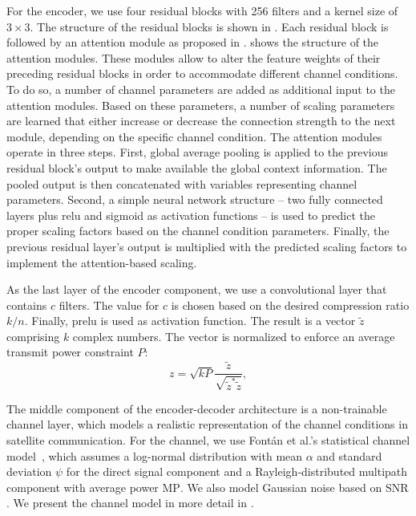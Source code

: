 \documentclass[conference]{IEEEtran}
\newcommand\MP{\ensuremath{\mathrm{MP}}\xspace}
\newcommand\SNR{\ensuremath{\mathrm{SNR}}\xspace}
\begin{document}
For the encoder, we use four residual blocks with 256 filters and a kernel size of $3 \times 3$.
The structure of the residual blocks is shown in .
Each residual block is followed by an attention module as proposed in \cite{wireless-attention-modules}.
 shows the structure of the attention modules.
These modules allow to alter the feature weights of their preceding residual blocks in order to accommodate different channel conditions.
To do so, a number of channel parameters are added as additional input to the attention modules.
Based on these parameters, a number of scaling parameters are learned that either increase or decrease the connection strength to the next module, depending on the specific channel condition.
The attention modules operate in three steps.
First, global average pooling is applied to the previous residual block's output to make available the global context information.
The pooled output is then concatenated with variables representing channel parameters.
Second, a simple neural network structure -- two fully connected layers plus \ac{relu} and sigmoid as activation functions -- is used to predict the proper scaling factors based on the channel condition parameters.
Finally, the previous residual layer's output is multiplied with the predicted scaling factors to implement the attention-based scaling.

As the last layer of the encoder component, we use a convolutional layer that contains $c$ filters.
The value for $c$ is chosen based on the desired compression ratio $k/n$.
Finally, \ac{prelu} is used as activation function.
The result is a vector $\tilde{z}$ comprising $k$ complex numbers.
The vector is normalized to enforce an average transmit power constraint $P$:
%
\begin{equation}
  z = \sqrt{kP}\frac{\tilde{z}}{\sqrt{\tilde{z}^{*} \tilde{z}}},
\end{equation}

The middle component of the encoder-decoder architecture is a non-trainable channel layer, which models a realistic representation of the channel conditions in satellite communication.
For the channel, we use Fontán et al.'s statistical channel model~\cite{966585}, which assumes a log-normal distribution with mean $\alpha$ and standard deviation $\psi$ for the direct signal component and a Rayleigh-distributed multipath component with average power \MP. We also model Gaussian noise based on \SNR.
We present the channel model in more detail in .
\end{document}
